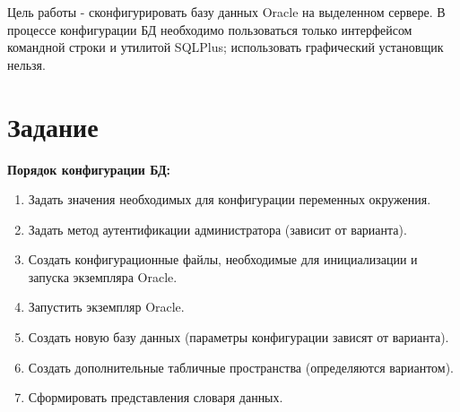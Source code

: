 \documentclass[12pt, a4paper]{article}
\begin{document}
	
	Цель работы - сконфигурировать базу данных Oracle на выделенном сервере. В процессе конфигурации БД необходимо пользоваться только интерфейсом командной строки и утилитой SQLPlus; использовать графический установщик нельзя.
	\section{Задание}
	\textbf{Порядок конфигурации БД:}\\
	\begin{enumerate}
		\item Задать значения необходимых для конфигурации переменных окружения.
		\item Задать метод аутентификации администратора (зависит от варианта).
		\item Создать конфигурационные файлы, необходимые для инициализации и запуска экземпляра Oracle.
		\item Запустить экземпляр Oracle.
		\item Создать новую базу данных (параметры конфигурации зависят от варианта).
		\item Создать дополнительные табличные пространства (определяются вариантом).
		\item Сформировать представления словаря данных.
	\end{enumerate}
	
\end{document}
